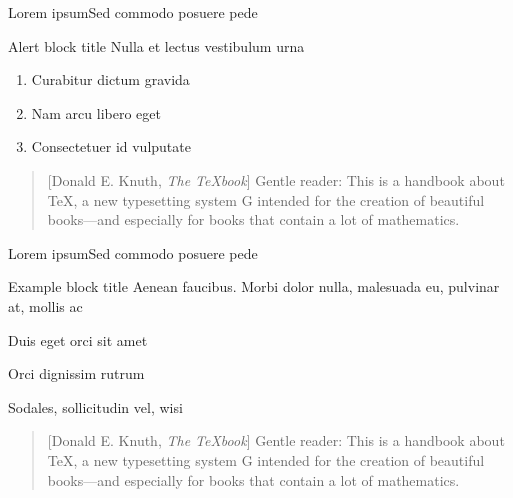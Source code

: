 \documentclass{beamer}
\begin{document}
\begin{frame}{Lorem ipsum}{Sed commodo posuere pede}

    \begin{alertblock}{Alert block title}
    Nulla et lectus vestibulum urna   
    \end{alertblock}
    
    
    \begin{enumerate}[<+->]
    	\item Curabitur dictum gravida
    	\item Nam arcu libero eget
    	\item Consectetuer id vulputate
    \end{enumerate}

\begin{quotation}[Donald E. Knuth, \emph{The \TeX book}]
Gentle reader: This is a handbook about \TeX, a new typesetting system G intended for the creation of beautiful books—and especially for books that contain a lot of mathematics.
\end{quotation}

\end{frame}
\begin{frame}{Lorem ipsum}{Sed commodo posuere pede}

    \begin{exampleblock}{Example block title}
    Aenean faucibus. Morbi dolor nulla, malesuada eu, pulvinar at, 
    mollis ac
    \end{exampleblock}
    
    \begin{description}[<+->]
    	\item[one] \alert<2>{Duis eget orci sit amet}
    	\item[two] \alert<3>{Orci dignissim rutrum}
    	\item[three] \alert<4>{Sodales, sollicitudin vel, wisi}
    \end{description}


    \begin{quotation}[Donald E. Knuth, \emph{The \TeX book}]
Gentle reader: This is a handbook about \TeX, a new typesetting system G intended for the creation of beautiful books—and especially for books that contain a lot of mathematics.
\end{quotation}


    
\end{frame}
\end{document}
